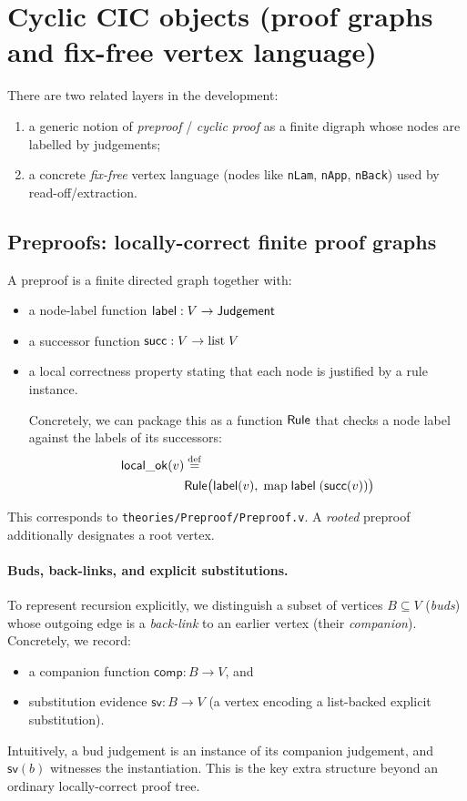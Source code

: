 \section{Cyclic CIC objects (proof graphs and fix-free vertex language)}
\label{sec:cyclic}

There are two related layers in the development:
\begin{enumerate}[label=(\arabic*)]
\item a generic notion of \emph{preproof} / \emph{cyclic proof} as a finite digraph whose nodes are labelled by judgements;
\item a concrete \emph{fix-free} vertex language (nodes like \texttt{nLam}, \texttt{nApp}, \texttt{nBack}) used by read-off/extraction.
\end{enumerate}

\subsection{Preproofs: locally-correct finite proof graphs}

A preproof is a finite directed graph together with:
\begin{itemize}
\item a node-label function \(\mathsf{label} : V \to \mathsf{Judgement}\)
\item a successor function \(\mathsf{succ} : V \to \mathrm{list}\;V\)
\item a local correctness property stating that each node is justified by a rule instance.

  Concretely, we can package this as a function \(\mathsf{Rule}\) that checks a node label against the labels of its successors:
  \[
    \begin{aligned}
      \mathsf{local\_ok}(v) &\stackrel{\mathrm{def}}{=}\\
      &\mathsf{Rule}\bigl(\mathsf{label}(v),\; \mathrm{map}\;\mathsf{label}\;(\mathsf{succ}(v))\bigr)
    \end{aligned}
  \]
\end{itemize}

This corresponds to \texttt{theories/Preproof/Preproof.v}.
A \emph{rooted} preproof additionally designates a root vertex.

\paragraph{Buds, back-links, and explicit substitutions.}
To represent recursion explicitly, we distinguish a subset of vertices \(B \subseteq V\) (\emph{buds}) whose outgoing edge is a \emph{back-link} to an earlier vertex (their \emph{companion}).
Concretely, we record:
\begin{itemize}
\item a companion function \(\mathsf{comp} : B \to V\), and
\item substitution evidence \(\mathsf{sv} : B \to V\) (a vertex encoding a list-backed explicit substitution).
\end{itemize}
Intuitively, a bud judgement is an instance of its companion judgement, and \(\mathsf{sv}(b)\) witnesses the instantiation.
This is the key extra structure beyond an ordinary locally-correct proof tree.

